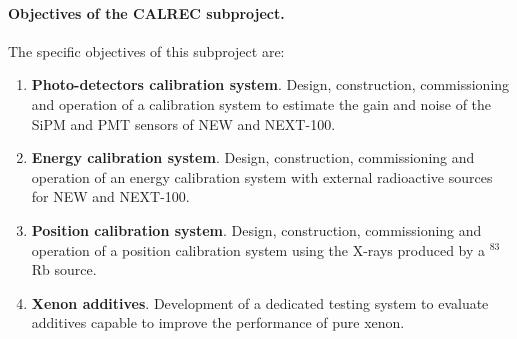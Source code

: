 \paragraph{Objectives of the CALREC subproject.}

The specific objectives of this subproject are:
\begin{enumerate}
\item {\bf Photo-detectors calibration system}. Design, construction, commissioning and operation of a calibration system to estimate the gain and noise of the SiPM and PMT sensors of NEW and NEXT-100. 

\item {\bf Energy calibration system}. Design, construction, commissioning and operation of an energy calibration system with external radioactive sources for NEW and NEXT-100.

\item {\bf Position calibration system}. Design, construction, commissioning and operation of a position calibration system using the X-rays produced by a $^{83}$Rb source. 

\item {\bf Xenon additives}. Development of a dedicated testing system to evaluate additives capable to improve the performance of pure xenon. 

\end{enumerate}

